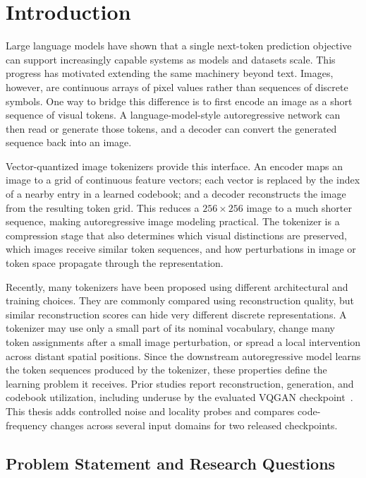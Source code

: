 \chapter{Introduction}
\label{ch:introduction}

Large language models have shown that a single next-token prediction objective
can support increasingly capable systems as models and datasets scale. This
progress has motivated extending the same machinery beyond text. Images,
however, are continuous arrays of pixel values rather than sequences of
discrete symbols. One way to bridge this difference is to first encode an image
as a short sequence of visual tokens. A language-model-style autoregressive
network can then read or generate those tokens, and a decoder can convert the
generated sequence back into an image.

Vector-quantized image tokenizers provide this interface. An encoder maps an
image to a grid of continuous feature vectors; each vector is replaced by the
index of a nearby entry in a learned codebook; and a decoder reconstructs the
image from the resulting token grid. This reduces a $256 \times 256$ image to a
much shorter sequence, making autoregressive image modeling practical. The
tokenizer is a compression stage that also determines which
visual distinctions are preserved, which images receive similar token
sequences, and how perturbations in image or token space propagate through the
representation.

Recently, many tokenizers have been proposed using different architectural
and training choices. They are commonly compared using reconstruction quality, but similar
reconstruction scores can hide very different discrete representations. A
tokenizer may use only a small part of its nominal vocabulary, change many
token assignments after a small image perturbation, or spread a local intervention
across distant spatial positions. Since the downstream autoregressive model
learns the token sequences produced by the tokenizer, these properties define
the learning problem it receives. Prior studies report reconstruction,
generation, and codebook utilization, including underuse by the evaluated
VQGAN checkpoint~\cite{esser2021taming,sun2024llamagen,liu2024elucidating}.
This thesis adds controlled noise and locality probes and compares
code-frequency changes across several input domains for two released
checkpoints.

\section{Problem Statement and Research Questions}
\label{sec:research_questions}

